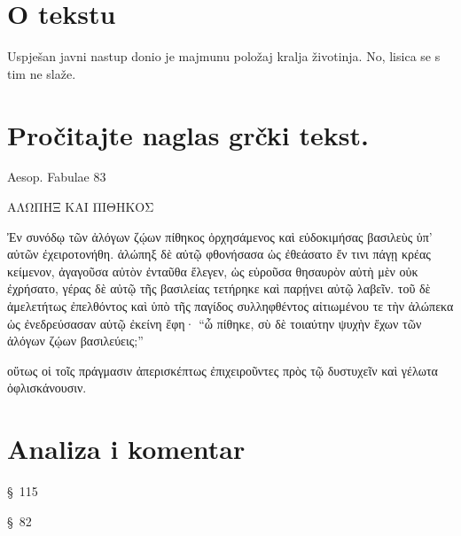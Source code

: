 


\section*{O tekstu}

Uspješan javni nastup donio je majmunu položaj kralja životinja. No, lisica se s tim ne slaže.


\section*{Pročitajte naglas grčki tekst.}


Aesop. Fabulae 83

\medskip

{\large
\begin{greek}
\noindent ΑΛΩΠΗΞ ΚΑΙ ΠΙΘΗΚΟΣ 

\noindent Ἐν συνόδῳ τῶν ἀλόγων ζῴων πίθηκος ὀρχησάμενος καὶ εὐδοκιμήσας βασιλεὺς ὑπ' αὐτῶν ἐχειροτονήθη. ἀλώπηξ δὲ αὐτῷ φθονήσασα ὡς ἐθεάσατο ἔν τινι πάγῃ κρέας κείμενον, ἀγαγοῦσα αὐτὸν ἐνταῦθα ἔλεγεν, ὡς εὑροῦσα θησαυρὸν αὐτὴ μὲν οὐκ ἐχρήσατο, γέρας δὲ αὐτῷ τῆς βασιλείας τετήρηκε καὶ παρῄνει αὐτῷ λαβεῖν. τοῦ δὲ ἀμελετήτως ἐπελθόντος καὶ ὑπὸ τῆς παγίδος συλληφθέντος αἰτιωμένου τε τὴν ἀλώπεκα ὡς ἐνεδρεύσασαν αὐτῷ ἐκείνη ἔφη· ``ὦ πίθηκε, σὺ δὲ τοιαύτην ψυχὴν ἔχων τῶν ἀλόγων ζῴων βασιλεύεις;''


οὕτως οἱ τοῖς πράγμασιν ἀπερισκέπτως ἐπιχειροῦντες πρὸς τῷ δυστυχεῖν καὶ γέλωτα ὀφλισκάνουσιν. 
\end{greek}

}

\newpage


\section*{Analiza i komentar}


\begin{description}[noitemsep]

\item[ΑΛΩΠΗΞ] §~115
\item[ΠΙΘΗΚΟΣ] §~82
\end{description}

